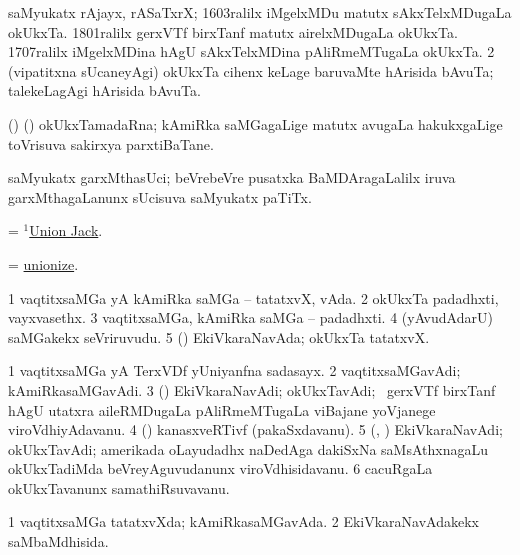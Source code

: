 \noindent 
\gl{\pagu}
\expl{}
\bmng
\bnum
{}  
\banum
{} saMyukatx rAjayx, rASaTxrX; 1603ralilx iMgelxMDu matutx sAkxTelxMDugaLa okUkxTa. 
 1801ralilx gerxVTf birxTanf matutx airelxMDugaLa okUkxTa. 
 1707ralilx iMgelxMDina hAgU sAkxTelxMDina pAliRmeMTugaLa okUkxTa. 
\eanum
\numie
\num{2}  (vipatitxna sUcaneyAgi) okUkxTa cihenx keLage baruvaMte hArisida bAvuTa; talekeLagAgi hArisida bAvuTa. 
\enum
\emng
\eentry

\bentry
{} 
\gl{\nA}
\expl{}
\bmng
(\birx) (\AmA) okUkxTamadaRna; kAmiRka saMGagaLige matutx avugaLa hakukxgaLige toVrisuva sakirxya parxtiBaTane. 
\emng
\eentry

\bentry
{}
\gl{\nA}
\expl{}
\bmng
saMyukatx garxMthasUci; beVrebeVre pusatxka BaMDAragaLalilx iruva garxMthagaLanunx sUcisuva saMyukatx paTiTx. 
\emng
\eentry

\bentry
{}
\gl{\nA}
\expl{}
\bmng
= \hyperlink{Union Jack(1)}{$^1$Union Jack}. 
\emng
\eentry

\bentry
{} 
\gl{\sakirx}
\expl{}
\bmng
= \hyperlink{unionize}{unionize}. 
\emng
\eentry

\bentry
{} 
\gl{\nA}
\bmng
\bnum
\num{1} vaqtitxsaMGa yA kAmiRka saMGa -- tatatxvX, vAda. 
\num{2} okUkxTa padadhxti, vayxvasethx. 
\num{3} vaqtitxsaMGa, kAmiRka saMGa -- padadhxti. 
\num{4} (yAvudAdarU) saMGakekx seVriruvudu. 
\num{5} (\ame) EkiVkaraNavAda; okUkxTa tatatxvX. 
\enum
\emng
\eentry

\bentry
{} 
\gl{\nA}
\expl{}
\bmng
\bnum
\num{1} vaqtitxsaMGa yA TerxVDf yUniyanfna sadasayx. 
\num{2} vaqtitxsaMGavAdi; kAmiRkasaMGavAdi. 
\num{3} (\rAshA) EkiVkaraNavAdi; okUkxTavAdi; \kanmu\ gerxVTf birxTanf hAgU utatxra aileRMDugaLa pAliRmeMTugaLa viBajane yoVjanege viroVdhiyAdavanu. 
\num{4} (\pArxparx) kanasxveRTivf (pakaSxdavanu). 
\num{5} (\ame, \ca) EkiVkaraNavAdi; okUkxTavAdi; amerikada oLayudadhx naDedAga dakiSxNa saMsAthxnagaLu okUkxTadiMda beVreyAguvudanunx viroVdhisidavanu. 
\num{6} cacuRgaLa okUkxTavanunx samathiRsuvavanu. 
\enum
\emng
\eentry

\bentry
{} 
\gl{\gu}
\expl{}
\bmng
\bnum
\num{1} vaqtitxsaMGa tatatxvXda; kAmiRkasaMGavAda. 
\num{2} EkiVkaraNavAdakekx saMbaMdhisida. 
\enum
\emng
\eentry

